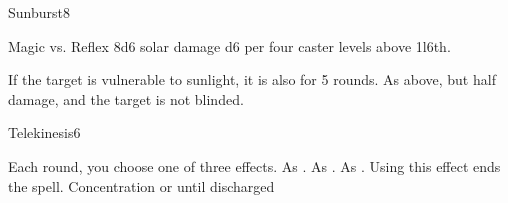 \begin{spellsection}{Sunburst}{8}
\begin{spellheader}
    \begin{spelltargetinginfo}
    \end{spelltargetinginfo}
\end{spellheader}
\begin{spellcontent}
    \begin{spelleffects}
        \begin{spellattack}{Magic vs. Reflex}
            \spellsuccess 8d6 solar damage \add d6 per four caster levels above 1l6th.

            If the target is vulnerable to sunlight, it is also \blinded for 5 rounds.
            \spellfailure As above, but half damage, and the target is not blinded.
        \end{spellattack}
    \end{spelleffects}
\end{spellcontent}
\begin{spellfooter}
\end{spellfooter}

\begin{comment}
\subsubsection{T}
\end{comment}
\end{spellsection}

\begin{spellsection}{Telekinesis}{6}
\begin{spellheader}
    \spellrng{\rngmed}
\end{spellheader}
\begin{spellcontent}
    \spellspecial Each round, you choose one of three effects.
     As .
     As .
     As . Using this effect ends the spell.
    \spelldur Concentration or until discharged
\end{spellcontent}
\begin{spellfooter}
\end{spellfooter}
\end{spellsection}

